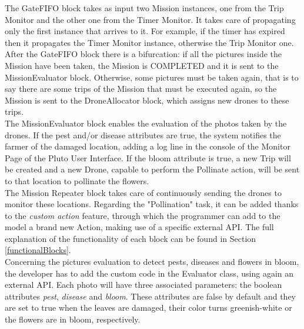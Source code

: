 The GateFIFO block takes as input two Mission instances, one from the Trip Monitor and the other one from the Timer Monitor.
It takes care of propagating only the first instance that arrives to it.
For example, if the timer has expired then it propagates the Timer Monitor instance, otherwise the Trip Monitor one.
\\

After the GateFIFO block there is a bifurcation:
if all the pictures inside the Mission have been taken, the Mission is COMPLETED and it is sent to the MissionEvaluator block.
Otherwise, some pictures must be taken again, that is to say there are some trips of the Mission that must be executed again, so the Mission is sent to the DroneAllocator block, which assigns new drones to these trips.
\\

The MissionEvaluator block enables the evaluation of the photos taken by the drones. If the pest and/or disease attributes are true, the system notifies the farmer of the damaged location, adding a log line in the console of the Monitor Page of the Pluto User Interface.
If the bloom attribute is true, a new Trip will be created and a new Drone, capable to perform the Pollinate action, will be sent to that location to pollinate the flowers.
\\

The Mission Repeater block takes care of continuously sending the drones to monitor these locations.
Regarding the "Pollination" task, it can be added thanks to the \textit{custom action} feature, through which the programmer can add to the model a brand new Action, making use of a specific external API.
The full explanation of the functionality of each block can be found in Section \ref{functionalBlocks}.
\\

Concerning the pictures evaluation to detect pests, diseases and flowers in bloom, the developer has to add the custom code in the Evaluator class, using again an external API. 
Each photo will have three associated parameters: the boolean attributes \textit{pest}, \textit{disease} and \textit{bloom}.
These attributes are false by default and they are set to true when the leaves are damaged, their color turns greenish-white or the flowers are in bloom, respectively. 
\\

